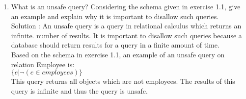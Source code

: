 \documentclass[10pt]{article}
\begin{document}
\begin{enumerate}
			
			
			\item What is an unsafe query? Considering the schema given in exercise 1.1, give an example and
			explain why it is important to disallow such queries.
				\\Solution : An unsafe query is a query in relational calculus which returns an infinite. number of results. It is important to disallow such queries because a database should return results for a query in a finite amount of time.
			\\Based on the schema in exercise 1.1, an example of an unsafe query on relation Employee is:\\
             $\{ e | \neg (e \in employees)\}$
        \\This query returns all objects which are not employees. The results of this query is infinite and thus the query is unsafe.
		\end{enumerate}
\end{document}
